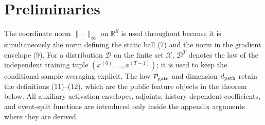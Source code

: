 \section{Preliminaries}
\label{sec:preliminaries}

The coordinate norm $\|\cdot\|_\infty$ on $\mathbb R^S$ is used throughout
because it is simultaneously the norm defining the static ball (7) and the
norm in the gradient envelope (9).  For a distribution $\mathcal D$ on the
finite set $\mathcal X$, $\mathcal D^T$ denotes the law of the independent
training tuple $(x^{(0)},\ldots,x^{(T-1)})$; it is used to keep the conditional
sample averaging explicit.  The law $\mathcal P_{\rm gate}$ and dimension
$d_{\rm path}$ retain the definitions (11)--(12), which are the public feature
objects in the theorem below.  All auxiliary activation envelopes, adjoints,
history-dependent coefficients, and event-split functions are introduced only
inside the appendix arguments where they are derived.
